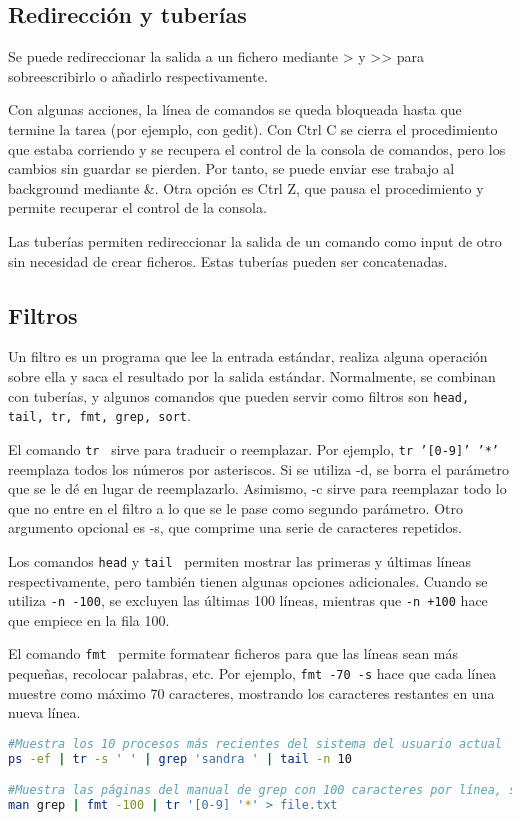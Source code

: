 \subsection{Redirección y tuberías}
Se puede redireccionar la salida a un fichero mediante > y >> para sobreescribirlo o añadirlo respectivamente. 

Con algunas acciones, la línea de comandos se queda bloqueada hasta que termine la tarea (por ejemplo, con gedit). Con Ctrl C se cierra el procedimiento que estaba corriendo y se recupera el control de la consola de comandos, pero los cambios sin guardar se pierden. Por tanto, se puede enviar ese trabajo al background mediante \&. Otra opción es Ctrl Z, que pausa el procedimiento y permite recuperar el control de la consola.

Las tuberías permiten redireccionar la salida de un comando como input de otro sin necesidad de crear ficheros. Estas tuberías pueden ser concatenadas.

\subsection{Filtros}
Un filtro es un programa que lee la entrada estándar, realiza alguna operación sobre ella y saca el resultado por la salida estándar. Normalmente, se combinan con tuberías, y algunos comandos que pueden servir como filtros son \texttt{head, tail, tr, fmt, grep, sort}.

El comando \texttt{tr} \marginpar[\footnotesize tr] \ sirve para traducir o reemplazar. Por ejemplo, \texttt{tr '[0-9]' '*'} reemplaza todos los números por asteriscos. Si se utiliza -d, se borra el parámetro que se le dé en lugar de reemplazarlo. Asimismo, -c sirve para reemplazar todo lo que no entre en el filtro a lo que se le pase como segundo parámetro. Otro argumento opcional es -s, que comprime  una serie de caracteres repetidos.

Los comandos \texttt{head} y \texttt{tail}  \ permiten mostrar las primeras y últimas líneas respectivamente, pero también tienen algunas opciones adicionales. Cuando se utiliza \texttt{-n -100}, se excluyen las últimas 100 líneas, mientras que \texttt{-n +100} hace que empiece en la fila 100. 

El comando \texttt{fmt}  \ permite formatear ficheros para que las líneas sean más pequeñas, recolocar palabras, etc. Por ejemplo, \texttt{fmt -70 -s} hace que cada línea muestre como máximo 70 caracteres, mostrando los caracteres restantes en una nueva línea.
\begin{lstlisting}[language=bash]
#Muestra los 10 procesos más recientes del sistema del usuario actual
ps -ef | tr -s ' ' | grep 'sandra ' | tail -n 10

#Muestra las páginas del manual de grep con 100 caracteres por línea, sustituyendo los dígitos por asteriscos y redireccionando a un fichero
man grep | fmt -100 | tr '[0-9] '*' > file.txt
\end{lstlisting}

